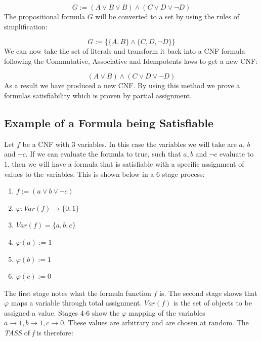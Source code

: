\documentclass[11pt,a4paper, notitlepage]{report}
\begin{document}
\begin{displaymath}
G:= (A \lor B \lor B) \land (C \lor D \lor \neg D)
\end{displaymath}
The propositional formula $G$ will be converted to a set by using the rules of simplification:

\begin{displaymath}
 G := \{\{{{A,B}\} \land \{{C,D,\neg D}}\}\}
\end{displaymath}
We can now take the set of literals and transform it back into a CNF formula following the Commutative, Associative and Idempotents laws to get a new CNF:

\begin{displaymath}
(A \lor B) \land (C \lor D \lor \neg D)
\end{displaymath}
As a result we have produced a new CNF. By using this method we prove a formulas satisfiability which is proven by partial assignment.


\subsection{Example of a Formula being Satisfiable}
\label{subsec:ExampleFormSAT}

Let $f$ be a CNF with 3 variables. In this case the variables we will take are $a$, $b$ and $\neg c$. If we can evaluate the formula to true, such that $a, b$ and $\neg c$ evaluate to 1, then we will have a formula that is satisfiable with a specific assignment of values to the variables. This is shown below in a 6 stage process:

\begin{enumerate}
\item $f:= (a \lor b \lor \neg c)$
\item $\varphi: Var (f) \rightarrow \{0,1\}$
\item $Var (f) = \{a,b,c\}$
\item $\varphi(a):= 1$
\item $\varphi(b):= 1$
\item $\varphi(c):= 0$
\end{enumerate}
The first stage notes what the formula function $f$ is. The second stage shows that $\varphi$ maps a variable through total assignment. $Var(f)$ is the set of objects to be assigned a value. Stages 4-6 show the $\varphi$ mapping of the variables $a \rightarrow 1, b \rightarrow 1, c \rightarrow 0$. These values are arbitrary and are chosen at random.
The \textit{TASS} of \textit{f} is therefore:
\end{document}
